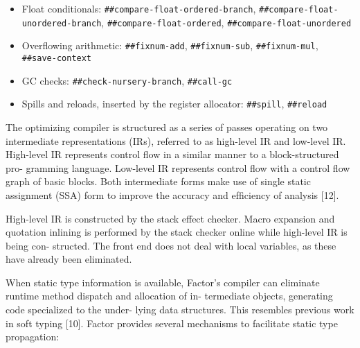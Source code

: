\begin{itemize}
\item
\begin{flushleft}
Float conditionals:
\Verb|##compare-float-ordered-branch|,
\Verb|##compare-float-unordered-branch|,
\Verb|##compare-float-ordered|,
\Verb|##compare-float-unordered|
\end{flushleft}

\item
\begin{flushleft}
Overflowing arithmetic:
\Verb|##fixnum-add|,
\Verb|##fixnum-sub|,
\Verb|##fixnum-mul|,
\Verb|##save-context|
\end{flushleft}

\item
\begin{flushleft}
\Gls{GC} checks:
\Verb|##check-nursery-branch|,
\Verb|##call-gc|
\end{flushleft}

\item
\begin{flushleft}
Spills and reloads, inserted by the register allocator:
\Verb|##spill|,
\Verb|##reload|
\end{flushleft}
\end{itemize}


The optimizing compiler is structured as a series of passes operating on two
intermediate representations (IRs), referred to as high-level IR and low-level
IR. High-level IR represents control ﬂow in a similar manner to a
block-structured pro- gramming language. Low-level IR represents control ﬂow
with a control ﬂow graph of basic blocks. Both intermediate forms make use of
single static assignment (SSA) form to improve the accuracy and efﬁciency of
analysis [12].

High-level IR is constructed by the stack effect checker.  Macro expansion and
quotation inlining is performed by the stack checker online while high-level IR
is being con- structed. The front end does not deal with local variables, as
these have already been eliminated.

When static type information is available, Factor’s compiler can eliminate
runtime method dispatch and allocation of in- termediate objects, generating
code specialized to the under- lying data structures. This resembles previous
work in soft typing [10]. Factor provides several mechanisms to facilitate
static type propagation:

